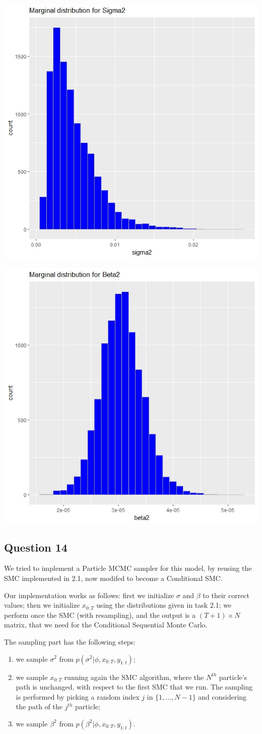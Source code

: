\documentclass[]{article}
\begin{document}
	\begin{center}
		
		\includegraphics[width=.4\textwidth]{task5/Gibbs_sigma2.jpeg}
		
		\includegraphics[width=.4\textwidth]{task5/Gibbs_beta2.jpeg}
		
	\end{center}
	
	
	
	\subsection*{Question 14}
	
	We tried to implement a Particle MCMC sampler for this model, by reusing the SMC implemented in 2.1, now modifed to become a Conditional SMC. 
	
	
	Our implementation works as follows: first we initialize $\sigma$ and $\beta$ to their correct values; then we initialize $x_{0:T}$ using the distributions given in task 2.1; we perform once the SMC (with resampling), and the output is a $(T+1) \times N$ matrix, that we need for the Conditional Sequential Monte Carlo.
	
	
	The sampling part has the following steps:
	
	\begin{enumerate}
		
		\item we sample $\sigma^2$ from $p(\sigma^2|\phi, x_{0:T}, y_{1:t})$;
		
		\item we sample $x_{0:T}$ running again the SMC algorithm, where  the $N^{th}$ particle's path is unchanged, with respect to the first SMC that we run. The sampling is performed by picking a random index $j$ in $\{1,...,N-1\}$ and considering the path of the $j^{th}$ particle;
		
		\item we sample $\beta^2$ from $p(\beta^2|\phi, x_{0:T}, y_{1:t})$.
		
	\end{enumerate}
	
\end{document}
